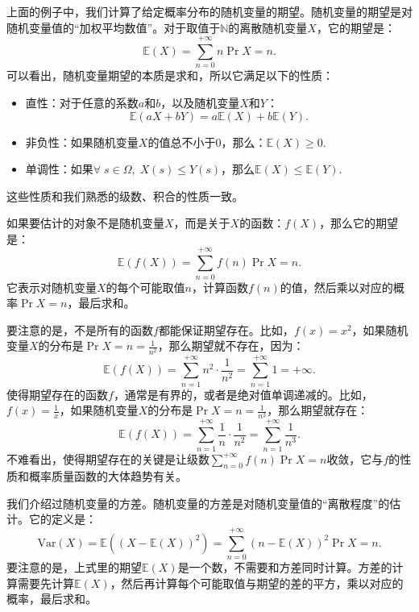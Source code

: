 \documentclass[12pt,UTF8]{ctexbook}
\begin{document}
上面的例子中，我们计算了给定概率分布的随机变量的期望。随机变量的期望是对随机变量值的“加权平均数值”。对于取值于$\mathbb{N}$的离散随机变量$X$，它的期望是：
\[
    \mathbb{E}(X) = \sum_{n=0}^{+\infty} n \Pr{X=n}.
\]
可以看出，随机变量期望的本质是求和，所以它满足以下的性质：
\begin{itemize}
    \item 直性：对于任意的系数$a$和$b$，以及随机变量$X$和$Y$：
    \[
        \mathbb{E}(aX + bY) = a\mathbb{E}(X) + b\mathbb{E}(Y).
    \]
    \item 非负性：如果随机变量$X$的值总不小于$0$，那么：$\mathbb{E}(X) \geqslant 0.$
    \item 单调性：如果$\forall \; s\in \Omega, \; X(s)\leqslant Y(s)$，那么$\mathbb{E}(X) \leqslant \mathbb{E}(Y).$
\end{itemize}
这些性质和我们熟悉的级数、积合的性质一致。

如果要估计的对象不是随机变量$X$，而是关于$X$的函数：$f(X)$，那么它的期望是：
\[
    \mathbb{E}(f(X)) = \sum_{n=0}^{+\infty} f(n) \Pr{X=n}.
\]
它表示对随机变量$X$的每个可能取值$n$，计算函数$f(n)$的值，然后乘以对应的概率$\Pr{X=n}$，最后求和。

要注意的是，不是所有的函数$f$都能保证期望存在。比如，$f(x) = x^2$，如果随机变量$X$的分布是$\Pr{X=n} = \frac{1}{n^2}$，那么期望就不存在，因为：
\[
    \mathbb{E}(f(X)) = \sum_{n=1}^{+\infty} n^2 \cdot \frac{1}{n^2} = \sum_{n=1}^{+\infty} 1 = +\infty.
\]
使得期望存在的函数$f$，通常是有界的，或者是绝对值单调递减的。比如，$f(x) = \frac{1}{x}$，如果随机变量$X$的分布是$\Pr{X=n} = \frac{1}{n^2}$，那么期望就存在：
\[
    \mathbb{E}(f(X)) = \sum_{n=1}^{+\infty} \frac{1}{n} \cdot \frac{1}{n^2} = \sum_{n=1}^{+\infty} \frac{1}{n^3}.
\]
不难看出，使得期望存在的关键是让级数$\sum_{n=0}^{+\infty} f(n) \Pr{X=n}$收敛，它与$f$的性质和概率质量函数的大体趋势有关。

我们介绍过随机变量的方差。随机变量的方差是对随机变量值的“离散程度”的估计。它的定义是：
\[
    \text{Var}(X) = \mathbb{E}((X - \mathbb{E}(X))^2) = \sum_{n=0}^{+\infty} (n - \mathbb{E}(X))^2 \Pr{X=n}.
\]
要注意的是，上式里的期望$\mathbb{E}(X)$是一个数，不需要和方差同时计算。方差的计算需要先计算$\mathbb{E}(X)$，然后再计算每个可能取值与期望的差的平方，乘以对应的概率，最后求和。
\end{document}
